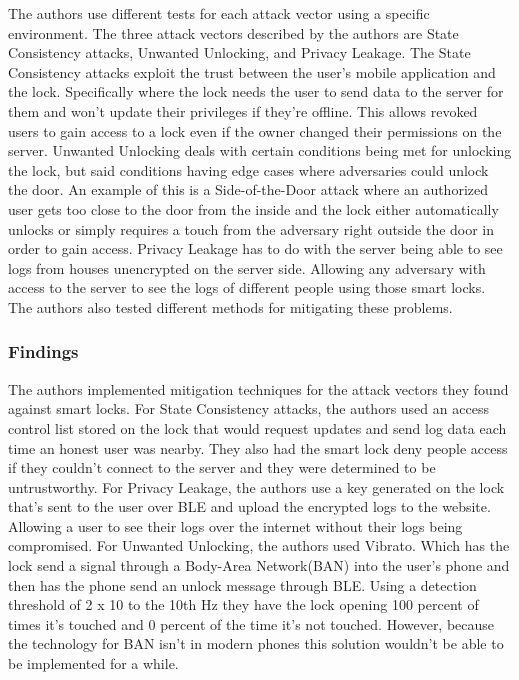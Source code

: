 \noindent
The authors use different tests for each attack vector using a specific environment. The three attack vectors described by the authors are State Consistency attacks, Unwanted Unlocking, and Privacy Leakage. The State Consistency attacks exploit the trust between the user’s mobile application and the lock. Specifically where the lock needs the user to send data to the server for them and won’t update their privileges if they’re offline. This allows revoked users to gain access to a lock even if the owner changed their permissions on the server. Unwanted Unlocking deals with certain conditions being met for unlocking the lock, but said conditions having edge cases where adversaries could unlock the door. An example of this is a Side-of-the-Door attack where an authorized user gets too close to the door from the inside and the lock either automatically unlocks or simply requires a touch from the adversary right outside the door in order to gain access. Privacy Leakage has to do with the server being able to see logs from houses unencrypted on the server side. Allowing any adversary with access to the server to see the logs of different people using those smart locks. The authors also tested different methods for mitigating these problems.

\subsubsection{Findings}

\noindent
The authors implemented mitigation techniques for the attack vectors they found against smart locks. For State Consistency attacks, the authors used an access control list stored on the lock that would request updates and send log data each time an honest user was nearby. They also had the smart lock deny people access if they couldn’t connect to the server and they were determined to be untrustworthy. For Privacy Leakage, the authors use a key generated on the lock that’s sent to the user over BLE and upload the encrypted logs to the website. Allowing a user to see their logs over the internet without their logs being compromised. For Unwanted Unlocking, the authors used Vibrato. Which has the lock send a signal through a Body-Area Network(BAN) into the user’s phone and then has the phone send an unlock message through BLE. Using a detection threshold of 2 x 10 to the 10th Hz they have the lock opening 100 percent of times it’s touched and 0 percent of the time it’s not touched. However, because the technology for BAN isn’t in modern phones this solution wouldn’t be able to be implemented for a while.

